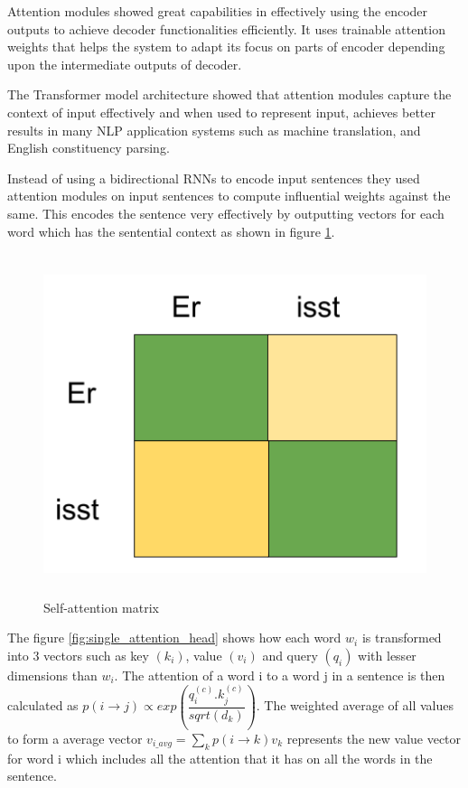 \documentclass[a4paper, 11pt]{article}
\begin{document}
Attention modules showed great capabilities in effectively using the encoder outputs to achieve decoder functionalities efficiently. It uses trainable attention weights that helps the system to adapt its focus on parts of encoder depending upon the intermediate outputs of decoder. 

The Transformer model architecture \parencite{Vaswani2017} showed that attention modules capture the context of input effectively and when used to represent input, achieves better results in many NLP application systems such as machine translation, and English constituency parsing.

Instead of using a bidirectional RNNs to encode input sentences they used attention modules on input sentences to compute influential weights against the same. This encodes the sentence very effectively by outputting vectors for each word which has the sentential context as shown in figure \ref{fig:self-attention-matrix-3}.

\begin{figure}[H]
    \centering
    \includegraphics[width=\textwidth,height=10cm,keepaspectratio=true]
    {self-attention-matrix-3.png}
    \caption{
       Self-attention matrix 
    }
    \label{fig:self-attention-matrix-3}
\end{figure}

The figure \ref{fig:single_attention_head} shows how each word $w_i$ is transformed into 3 vectors such as key $(k_i)$,  value $(v_i)$ and query $(q_i)$ with lesser dimensions than $w_i$. The attention of a word i to a word j in a sentence is then calculated as 
$ p(i\rightarrow{}j) \propto exp(\dfrac{q^{(c)}_i.k^{(c)}_j}{sqrt(d_k)}) $. The weighted average of all values to form a average vector $v_{i\_avg} = \sum_{k}p(i\rightarrow{}k)v_k$ represents the new value vector for word i which includes all the attention that it has on all the words in the sentence. 
\end{document}
